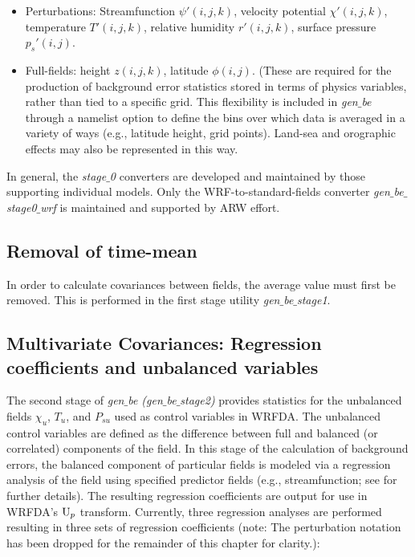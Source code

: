 \begin{itemize}\setlength{\parskip}{-4pt}
\item
 	Perturbations: Streamfunction $\psi'(i,j,k)$, velocity potential $\chi'(i,j,k)$, 
temperature $T'(i,j,k)$, relative humidity $r'(i,j,k)$, surface pressure $p_s'(i,j)$.

\item
 	Full-fields: height $z(i,j,k)$, latitude $\phi(i,j)$. (These are required for the 
production of background error statistics stored in terms of physics variables, 
rather than tied to a specific grid. This flexibility is included in {\it gen$\_$be} through a 
namelist option to define the bins over which data is averaged in a variety of ways 
(e.g., latitude height, grid points). Land-sea and orographic effects may also be 
represented in this way.
\end{itemize}

In general, the {\it stage$\_$0} converters are developed and maintained by those supporting
individual models. Only the WRF-to-standard-fields converter {\it gen$\_$be$\_$stage0$\_$wrf} 
is maintained and supported by ARW effort.

\subsection{Removal of time-mean}

In order to calculate covariances between fields, the average value must first be removed. 
This is performed in the first stage utility {\it gen$\_$be$\_$stage1}. 

\subsection{Multivariate Covariances: Regression coefficients and unbalanced variables}

The second stage
of {\it gen$\_$be (gen$\_$be$\_$stage2)} provides statistics for the
unbalanced fields $\chi_u$, $T_u$, and $P_{su}$ used as control
variables in WRFDA. The unbalanced control variables are defined as
the difference between full and balanced (or correlated) components of
the field. In this stage of the calculation of background errors, the
balanced component of particular fields is modeled via a regression
analysis of the field using specified predictor fields
(e.g., streamfunction; see
\citet{wu02} for further details). The resulting regression coefficients 
are output for use 
in WRFDA's ${\rm U}_p$ transform. Currently, three regression analyses are
performed resulting in three sets of regression coefficients (note:
The perturbation notation has been dropped for the 
remainder of this chapter for clarity.):

